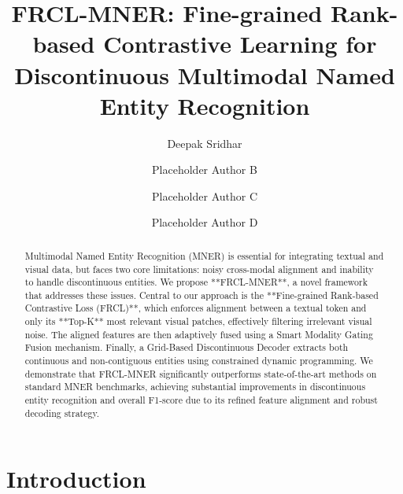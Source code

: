 \documentclass[runningheads]{llncs}
\begin{document}
\title{FRCL-MNER: Fine-grained Rank-based Contrastive Learning for Discontinuous Multimodal Named Entity Recognition}
 
\author{Deepak Sridhar \and Placeholder Author B  \and Placeholder Author C  \and Placeholder Author D }



\maketitle

\begin{abstract} 
Multimodal Named Entity Recognition (MNER) is essential for integrating textual and visual data, but faces two core limitations: noisy cross-modal alignment and inability to handle discontinuous entities. We propose **FRCL-MNER**, a novel framework that addresses these issues. Central to our approach is the **Fine-grained Rank-based Contrastive Loss (FRCL)**, which enforces alignment between a textual token and only its **Top-K** most relevant visual patches, effectively filtering irrelevant visual noise. The aligned features are then adaptively fused using a Smart Modality Gating Fusion mechanism. Finally, a Grid-Based Discontinuous Decoder extracts both continuous and non-contiguous entities using constrained dynamic programming. We demonstrate that FRCL-MNER significantly outperforms state-of-the-art methods on standard MNER benchmarks, achieving substantial improvements in discontinuous entity recognition and overall F1-score due to its refined feature alignment and robust decoding strategy.
\end{abstract}


\section{Introduction}
\end{document}
